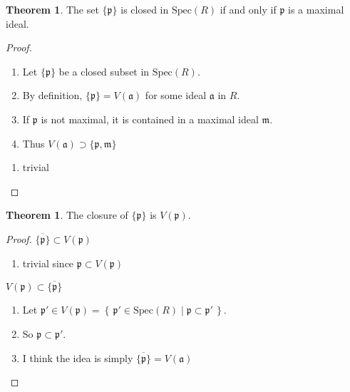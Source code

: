 \documentclass[a4paper]{book}
\theoremstyle{definition}
\newtheorem{theorem}[definition]{Theorem}
\newcommand{\makeset}[2]{\left\{\, #1 \mid #2 \,\right\}}
\begin{document}
\begin{thmbox}
    \begin{theorem}
        The set \(\{\mathfrak{p}\}\) is closed in \(\text{Spec}(R)\) if and only if \(\mathfrak{p}\) is a maximal ideal.
    \end{theorem}
\end{thmbox}
\begin{proof}
    \begin{enumerate}
        \item Let \(\{\mathfrak{p}\}\) be a closed subset in \(\text{Spec}(R)\).
        \item By definition, \(\{\mathfrak{p}\} = V(\mathfrak{a})\) for some ideal \(\mathfrak{a}\) in \(R\).
        \item If \(\mathfrak{p}\) is not maximal, it is contained in a maximal ideal \(\mathfrak{m}\).
        \item Thus \(V(\mathfrak{a}) \supset \{\mathfrak{p}, \mathfrak{m}\}\)
    \end{enumerate}

    \begin{enumerate}
        \item trivial
    \end{enumerate}
\end{proof}


\begin{thmbox}
    \begin{theorem}
        The closure of \(\{\mathfrak{p}\}\) is \(V(\mathfrak{p})\).
    \end{theorem}
\end{thmbox}
\begin{proof}
    \(\overline{\{\mathfrak{p}\}} \subset V(\mathfrak{p})\)
    \begin{enumerate}
        \item trivial since \(\mathfrak{p} \subset V(\mathfrak{p})\)
    \end{enumerate}
    \(V(\mathfrak{p}) \subset \overline{\{\mathfrak{p}\}}\)
    \begin{enumerate}
        \item Let \(\mathfrak{p}' \in V(\mathfrak{p}) = \makeset{\mathfrak{p}' \in \text{Spec}(R)}{\mathfrak{p} \subset \mathfrak{p}'}\).
        \item So \(\mathfrak{p} \subset \mathfrak{p}'\).
        \item I think the idea is simply \(\overline{\{\mathfrak{p}\}} = V(\mathfrak{a})\)
    \end{enumerate}
\end{proof}
\end{document}
